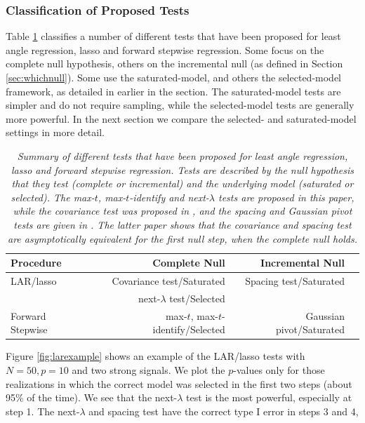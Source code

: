 \documentclass{article}
\begin{document}
\subsubsection{Classification of Proposed Tests}
Table \ref{tab:testsummary} classifies a number of different tests that have been proposed for least angle regression, lasso and forward stepwise regression. Some focus on the complete null hypothesis, others on the incremental null (as defined in Section \ref{sec:whichnull}).
Some use the saturated-model, and others the selected-model framework, as detailed in earlier in the section.
The saturated-model tests are simpler and do not require sampling, while the selected-model tests are generally more powerful. In the next section we compare the selected- and saturated-model settings in more detail.

\begin{table}
\begin{center}
\begin{tabular}{ | l | r|r| r}
        \hline
Procedure& Complete Null & Incremental Null\\
\hline
LAR/lasso& Covariance test/Saturated&Spacing test/Saturated \\
        & next-$\lambda$ test/Selected& \\
        \hline
Forward Stepwise &max-$t$, max-$t$-identify/Selected &Gaussian pivot/Saturated\\
\hline
\end{tabular}
\end{center}
\caption{\em Summary of different tests that have been proposed for least angle regression, lasso and forward stepwise regression.
Tests are described by the null hypothesis that they test (complete or incremental)  and the underlying model (saturated or selected).
The max-$t$, max-$t$-identify and next-$\lambda$ tests are proposed in this paper, while the covariance test was proposed in \citet{lockhart2014significance}, and the spacing and Gaussian
pivot tests are given in \citet{taylor2014exact}. The latter paper shows that the covariance and spacing test are asymptotically equivalent for the first null step, when the complete null holds.}
\label{tab:testsummary}
\end{table}
Figure  \ref{fig:larexample} shows an example of the LAR/lasso tests with $N=50, p=10$ and two strong signals.
We plot the $p$-values only for those realizations in which the correct model was selected in the first two steps (about 95\% of the time).
We see that the next-$\lambda$ test is the most powerful, especially at step 1. The next-$\lambda$ and spacing test have the correct type I error in steps 3 and 4,
\end{document}
